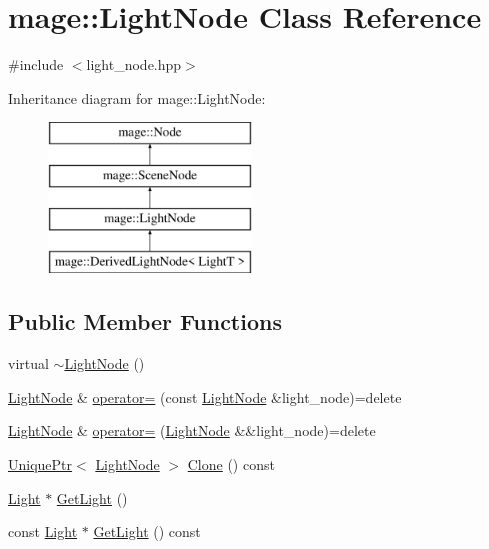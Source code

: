 \hypertarget{classmage_1_1_light_node}{}\section{mage\+:\+:Light\+Node Class Reference}
\label{classmage_1_1_light_node}


{\ttfamily \#include $<$light\+\_\+node.\+hpp$>$}

Inheritance diagram for mage\+:\+:Light\+Node\+:\begin{figure}[H]
\begin{center}
\leavevmode
\includegraphics[height=4.000000cm]{classmage_1_1_light_node}
\end{center}
\end{figure}
\subsection*{Public Member Functions}
\begin{DoxyCompactItemize}
\item 
virtual \hyperlink{classmage_1_1_light_node_ad0c650ac0059589c28a3d1cfec95c07d}{$\sim$\+Light\+Node} ()
\item 
\hyperlink{classmage_1_1_light_node}{Light\+Node} \& \hyperlink{classmage_1_1_light_node_a41e3ee25215ccc1cbaed4b73e393930a}{operator=} (const \hyperlink{classmage_1_1_light_node}{Light\+Node} \&light\+\_\+node)=delete
\item 
\hyperlink{classmage_1_1_light_node}{Light\+Node} \& \hyperlink{classmage_1_1_light_node_abda92f7cf2ce3aed3af94d2278e2bfa1}{operator=} (\hyperlink{classmage_1_1_light_node}{Light\+Node} \&\&light\+\_\+node)=delete
\item 
\hyperlink{namespacemage_a8c307fbcc33bce9b7f2aa4c26c3b95cf}{Unique\+Ptr}$<$ \hyperlink{classmage_1_1_light_node}{Light\+Node} $>$ \hyperlink{classmage_1_1_light_node_a4d0c10f03de71cd497635feb431d02d5}{Clone} () const
\item 
\hyperlink{classmage_1_1_light}{Light} $\ast$ \hyperlink{classmage_1_1_light_node_a349db4c9d929d6136d3b760d40c8185a}{Get\+Light} ()
\item 
const \hyperlink{classmage_1_1_light}{Light} $\ast$ \hyperlink{classmage_1_1_light_node_ade3e075c510e37649c737be362508a7d}{Get\+Light} () const
\end{DoxyCompactItemize}
